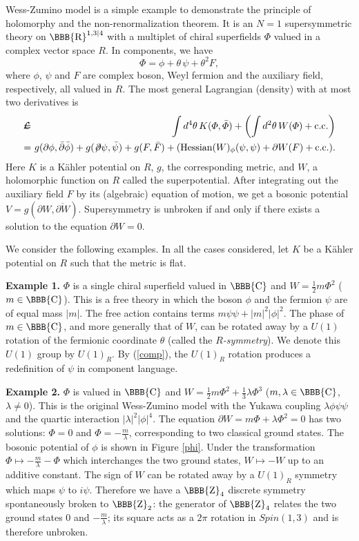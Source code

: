 \documentclass[lecture]{qft-l}
\newcommand{\lam}{\lambda}
\newcommand{\tht}{\theta}
\newcommand{\PHI}{\varPhi}
\newcommand{\ZZ}{{\mbox{\BBB{Z}}}}
\newcommand{\RE}{{\mbox{\BBB{R}}}}
\newcommand{\CO}{{\mbox{\BBB{C}}}}
\newcommand{\bea}{\begin{eqnarray}}
\newcommand{\eea}{\end{eqnarray}}
\newcommand{\nno}{\nonumber \\}
\newcommand{\sep}[1]{\!\!\!\! &{#1}& \!\!\!\! }
\newcommand{\eq}{\sep{=}}
\newcommand{\inv}[1]{\frac{1}{#1}}
\newcommand{\hf}{{\textstyle \inv{2}}}
\newcommand{\ii}{i}
\newcommand{\dr}{d}
\newcommand{\pdr}{\partial}
\newcommand{\cc}{{\rm c.c.}}
\newcommand{\LL}{{\mathcal L}}
\newcommand{\phib}{\bar{\phi}}
\newcommand{\ka}{K\"ahler }
\numberwithin{figure}{chapter}
\begin{document}

Wess-Zumino model is a simple example to demonstrate the principle of
holomorphy and the non-renormalization theorem.
It is an $N=1$ supersymmetric theory on $\RE^{1,3|4}$ with a multiplet 
of chiral superfields $\PHI$ valued in a complex vector space $R$.
In components, we have
	\begin{equation}\label{comp}
\PHI=\phi+\tht\,\psi+\tht^2F,
	\end{equation}
where $\phi$, $\psi$ and $F$ are complex boson, Weyl fermion and
the auxiliary field, respectively, all valued in $R$.
The most general Lagrangian (density) with at most two derivatives is
	\bea
\LL\eq\int\dr^4\tht\,K(\PHI,\bar{\PHI})
	+\left(\int\dr^2\tht\,W(\PHI)+\cc\right)			\nno
   \eq g(\pdr\phi,\bar{\pdr}\phib)+g(\not\!\pdr\psi,\bar{\psi})+g(F,\bar{F})
       +({\rm Hessian}(W)_\phi(\psi,\psi)+\pdr W(F)+\cc).
	\eea
Here $K$ is a \ka potential on $R$, $g$, the corresponding metric,
and $W$, a holomorphic function on $R$ called the superpotential.
After integrating out the auxiliary field $F$ by its (algebraic) equation 
of motion, we get a bosonic potential $V=g(\pdr W, \overline{\pdr W})$.
Supersymmetry is unbroken if and only if there exists a solution
to the equation $\pdr W=0$.

We consider the following examples.
In all the cases considered, let $K$ be a \ka potential on $R$ such that
the metric is flat.

\medskip\noindent
{\bf Example 1.} $\PHI$ is a single chiral superfield valued in $\CO$ and 
$W=\hf m\PHI^2$ ($m\in\CO$).
This is a free theory in which the boson $\phi$ and the fermion $\psi$ are 
of equal mass $|m|$.
The free action contains terms $m\psi\psi+|m|^2|\phi|^2$.
The phase of $m\in\CO$, and more generally that of $W$, can be rotated
away by a $U(1)$ rotation of the fermionic coordinate $\tht$
(called the {\em $R$-symmetry}).
We denote this $U(1)$ group by $U(1)_R$.
By (\ref{comp}), the $U(1)_R$ rotation produces a redefinition of $\psi$
in component language.

\medskip\noindent
{\bf Example 2.} $\PHI$ is valued in $\CO$ and 
$W=\hf m\PHI^2+\inv{3}\lam\PHI^3$ ($m,\lam\in\CO$, $\lam\ne0$). 
This is the original Wess-Zumino model with the Yukawa coupling
$\lam\phi\psi\psi$ and the quartic interaction $|\lam|^2|\phi|^4$.
The equation $\pdr W=m\PHI+\lam\PHI^2=0$ has two solutions: $\PHI=0$ and
$\PHI=-\frac{m}{\lam}$, corresponding to two classical ground states.
The bosonic potential of $\phi$ is shown in Figure \ref{phi}.
Under the transformation $\PHI\mapsto-\frac{m}{\lam}-\PHI$ which interchanges
the two ground states, $W\mapsto-W$ up to an additive constant.
The sign of $W$ can be rotated away by a $U(1)_R$ symmetry which
maps $\psi$ to $\ii\psi$.
Therefore we have a $\ZZ_4$ discrete symmetry spontaneously broken to $\ZZ_2$:
the generator of $\ZZ_4$ relates the two ground states $0$ and 
$-\frac{m}{\lam}$; 
its square acts as a $2\pi$ rotation in $\mathit{Spin}(1,3)$ and
is therefore unbroken.
\end{document}
